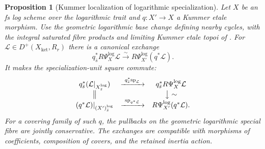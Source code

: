 \documentclass[11pt]{article}
\newtheorem{proposition}[theorem]{Proposition}
\theoremstyle{definition}
\theoremstyle{remark}
\begin{document}
\begin{proposition}[Kummer localization of logarithmic specialization]
\label{prop:frag-log-specialization-kummer-localization}
Let $X$ be an fs log scheme over the logarithmic trait and
$q:X'\to X$ a Kummer etale morphism.  Use the geometric logarithmic
base change defining nearby cycles, with the integral saturated fibre
products and limiting Kummer etale topoi of
\cite[\S8.2, (8.2.1)]{FujiwaraKatoNakayama}.
For $\mathcal L\in D^+(X_{\mathrm{ket}},R_r)$ there is a canonical
exchange
\[
 q_{\bar s}^*R\Psi_X^{\log}\mathcal L
 \xrightarrow{\sim}
 R\Psi_{X'}^{\log}(q^*\mathcal L).
\]
It makes the specialization-unit square commute:
\[
\begin{array}{ccc}
 q_{\bar s}^*(\mathcal L|_{X_{\bar s}^{\log}})
 &\xrightarrow{\ q_{\bar s}^*\mathrm{sp}_{\mathcal L}\ }&
 q_{\bar s}^*R\Psi_X^{\log}\mathcal L\\
 \big\Vert&&\big\downarrow\sim\\
(q^*\mathcal L)|_{(X')_{\bar s}^{\log}}
 &\xrightarrow{\ \mathrm{sp}_{q^*\mathcal L}\ }&
 R\Psi_{X'}^{\log}(q^*\mathcal L).
\end{array}
\]
For a covering family of such $q$, the pullbacks on the geometric
logarithmic special fibre are jointly conservative.  The exchanges
are compatible with morphisms of coefficients, composition of covers,
and the retained inertia action.
\end{proposition}
\end{document}
